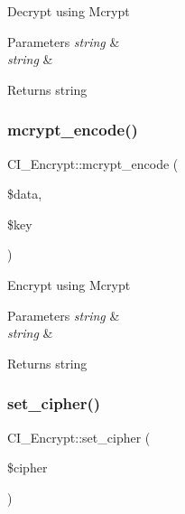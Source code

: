 Decrypt using Mcrypt


\begin{DoxyParams}{Parameters}
{\em string} & \\
\hline
{\em string} & \\
\hline
\end{DoxyParams}
\begin{DoxyReturn}{Returns}
string 
\end{DoxyReturn}
\mbox{\label{class_c_i___encrypt_a97f07123b0ff7d39e35b73cf3204d47b}} 
\subsubsection{\texorpdfstring{mcrypt\+\_\+encode()}{mcrypt\_encode()}}
{\footnotesize\ttfamily C\+I\+\_\+\+Encrypt\+::mcrypt\+\_\+encode (\begin{DoxyParamCaption}\item[{}]{\$data,  }\item[{}]{\$key }\end{DoxyParamCaption})}

Encrypt using Mcrypt


\begin{DoxyParams}{Parameters}
{\em string} & \\
\hline
{\em string} & \\
\hline
\end{DoxyParams}
\begin{DoxyReturn}{Returns}
string 
\end{DoxyReturn}
\mbox{\label{class_c_i___encrypt_aafe98e2eebfd602c3fd83c04958b40ca}} 
\subsubsection{\texorpdfstring{set\+\_\+cipher()}{set\_cipher()}}
{\footnotesize\ttfamily C\+I\+\_\+\+Encrypt\+::set\+\_\+cipher (\begin{DoxyParamCaption}\item[{}]{\$cipher }\end{DoxyParamCaption})}

